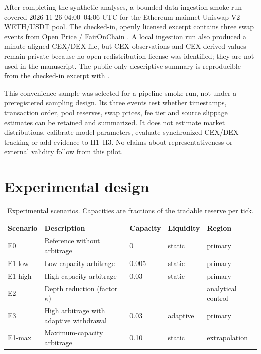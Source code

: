 After completing the synthetic analyses, a bounded data-ingestion smoke run covered 2026-11-26 04:00--04:06 UTC for the Ethereum mainnet Uniswap V2 WETH/USDT pool. The checked-in, openly licensed excerpt contains three swap events from Open Price / FairOnChain \cite{openpriceethereum2026}. A local ingestion run also produced a minute-aligned CEX/DEX file, but CEX observations and CEX-derived values remain private because no open redistribution license was identified; they are not used in the manuscript. The public-only descriptive summary is reproducible from the checked-in excerpt with .

This convenience sample was selected for a pipeline smoke run, not under a preregistered sampling design. Its three events test whether timestamps, transaction order, pool reserves, swap prices, fee tier and source slippage estimates can be retained and summarized. It does not estimate market distributions, calibrate model parameters, evaluate synchronized CEX/DEX tracking or add evidence to H1--H3. No claims about representativeness or external validity follow from this pilot.

\section{Experimental design}

\begin{table}[htbp]
\centering
\caption{Experimental scenarios. Capacities are fractions of the tradable reserve per tick.}
\label{tab:escenarios}
\small
\begin{tabularx}{\textwidth}{@{}l >{\raggedright\arraybackslash}X l l l@{}}
\toprule
Scenario & Description & Capacity & Liquidity & Region \\
\midrule
E0 & Reference without arbitrage & 0 & static & primary \\
E1-low & Low-capacity arbitrage & 0.005 & static & primary \\
E1-high & High-capacity arbitrage & 0.03 & static & primary \\
E2 & Depth reduction (factor $\kappa$) & --- & --- & analytical control \\
E3 & High arbitrage with adaptive withdrawal & 0.03 & adaptive & primary \\
E1-max & Maximum-capacity arbitrage & 0.10 & static & extrapolation \\
\bottomrule
\end{tabularx}
\end{table}

